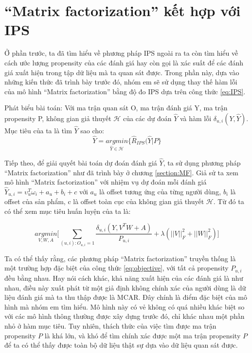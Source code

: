 \section{``Matrix factorization'' kết hợp với IPS}
\label{sec:3_MFIPS}
Ở phần trước, ta đã tìm hiểu về phương pháp IPS ngoài ra ta còn tìm hiểu về cách ước lượng propensity của các đánh giá hay còn gọi là xác suất để các đánh giá xuất hiện trong tập dữ liệu mà ta quan sát được. Trong phần này, dựa vào những kiến thức đã trình bày trước đó, nhóm em sẽ sử dụng thay thế hàm lỗi của mô hình ``Matrix factorization'' bằng độ đo IPS dựa trên công thức \ref{eq:IPS}. 

Phát biểu bài toán: Với ma trận quan sát O, ma trận đánh giá Y, ma trận propensity P, không gian giả thuyết $\mathcal{H}$ của các dự đoán $\hat{Y}$ và hàm lỗi $\delta_{u,i}(Y, \hat{Y})$. Mục tiêu của ta là tìm $\hat{Y}$ sao cho:
\begin{equation}
    \label{eq:ERM}
    \hat{Y} = \underset{\hat{Y} \in \mathcal{H}}{argmin}\bigg\{\hat{R}_{IPS}(\hat{Y}|P\bigg\}
\end{equation}

Tiếp theo, để giải quyết bài toán dự đoán đánh giá $\hat{Y}$, ta sử dụng phương pháp ``Matrix factorization'' như đã trình bày ở chương \ref{section:MF}. Giả sử ta xem mô hình ``Matrix factorization'' với nhiệm vụ dự đoán mỗi đánh giá $\hat{Y}_{u,i} = \upsilon_u^T \omega_i + a_u + b_i + c$ với $a_u$ là  offset tương ứng của từng người dùng, $b_i$ là offset của sản phẩm, c là offset toàn cục của không gian giả thuyết $\mathcal{H}$. Từ đó ta có thể xem mục tiêu huấn luyện của ta là:

\begin{equation}
    \label{eq:objective}
    \underset{V,W,A}{argmin} \bigg[ \sum_{(u,i):O_{u,i}=1} \frac{\delta_{u,i}(Y,V^TW + A)}{P_{u,i}} + \lambda(||V||_{F}^2 + ||W||_{F}^2) \Bigg]
\end{equation}

Ta có thể thấy rằng, các phương pháp ``Matrix factorization'' truyền thống là một trường hợp đặc biệt của công thức \ref{eq:objective}, với tất cả propensity $P_{u,i}$ đều bằng nhau. Hay nói cách khác, khả năng xuất hiện của các đánh giá là như nhau, điều này xuất phát từ một giả định không chính xác của người dùng là dữ liệu đánh giá mà ta thu thập được là MCAR. Đây chính là điểm đặc biệt của mô hình mà nhóm em tìm hiểu. Mô hình này có vẻ không có quá nhiều khác biệt so với các mô hình thông thường được xây dựng trước đó, chỉ khác nhau một phần nhỏ ở hàm mục tiêu. Tuy nhiên, thách thức của việc tìm được ma trận propensity $P$ là khá lớn, và khó để tìm chính xác được một ma trận propensity $P$ để ta có thể thấy được toàn bộ dữ liệu thật sự dựa vào dữ liệu quan sát được. 

